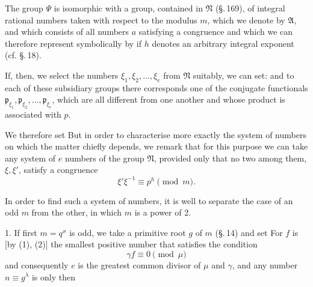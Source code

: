 The group $\Psi$ is isomorphic with a group, contained in $\mathfrak{N}$ (\S.\,169), of integral
rational numbers taken with respect to the modulus $m$, which we denote by $\mathfrak{A}$, and
which consists of all numbers $a$ satisfying a
congruence
and which we can therefore represent symbolically by
if $h$ denotes an arbitrary integral exponent (cf. \S.\,18).

If, then, we select the numbers $\xi_1, \xi_2, \ldots, \xi_e$ from $\mathfrak{N}$
suitably, we can set:
and to each of these subsidiary groups there corresponds one of the conjugate functionals $\mathfrak{p}_{\xi_1}, \mathfrak{p}_{\xi_2}, \ldots, \mathfrak{p}_{\xi_e}$, which are all different from one another and whose product is associated with $p$.

We therefore set
But in order to characterise more exactly the system of numbers
on which the matter chiefly depends,
we remark that for this purpose we can take any system of $e$ numbers of the
group $\mathfrak{N}$, provided only that no two among them,
$\xi, \xi'$, satisfy a congruence
\[
\xi'\xi^{-1} \equiv p^h \pmod{m}.
\]

In order to find such a system of numbers, it is well to separate the case
of an odd $m$ from the other, in which $m$ is a
power of 2.

1. If first $m = q^{\varkappa}$ is odd, we take a
primitive root $g$ of $m$ (\S.\,14) and set
For $f$ is [by (1), (2)] the smallest positive number that satisfies the
condition
\[
\gamma f \equiv 0 \pmod{\mu}
\]
and consequently $e$ is the greatest common divisor
of $\mu$ and $\gamma$, and any number $n \equiv g^{\lambda}$ is only then
